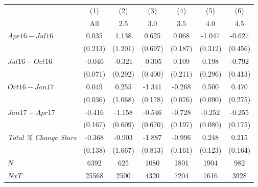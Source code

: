 \begin{center}
\begin{tabular}{lcccccc}
\hline  & (1) & (2) & (3) & (4) & (5) & (6)\\
 & All &  $ 2.5 $  &  $ 3.0 $  &  $ 3.5 $  &  $ 4.0 $  &  $ 4.5$ \\
\hline  $ Apr16-Jul16 $  & 0.035 & 1.138 & 0.625 & 0.068 & -1.047 & -0.627\\
 & (0.213) & (1.201) & (0.697) & (0.187) & (0.312) & (0.456)\\
 $ Jul16-Oct16 $  & -0.046 & -0.321 & -0.305 & 0.109 & 0.198 & -0.792\\
 & (0.071) & (0.292) & (0.400) & (0.211) & (0.296) & (0.413)\\
 $ Oct16-Jan17 $  & 0.049 & 0.255 & -1.341 & -0.268 & 0.500 & 0.470\\
 & (0.036) & (1.068) & (0.178) & (0.076) & (0.090) & (0.275)\\
 $ Jan17-Apr17 $  & -0.416 & -1.158 & -0.546 & -0.728 & -0.252 & -0.255\\
 & (0.167) & (0.609) & (0.670) & (0.197) & (0.080) & (0.175)\\
\hline \textit{Total \% Change Stars} & -0.368 & -0.903 & -1.887 & -0.996 & 0.248 & 0.215\\
  & (0.138) & (1.667) & (0.813) & (0.161) & (0.123) & (0.164)\\
\hline  $ N $  & 6392 & 625 & 1080 & 1801 & 1904 & 982\\
 $ NxT $  & 25568 & 2500 & 4320 & 7204 & 7616 & 3928\\
\hline\end{tabular}\\
\begin{tiny} \hfil\end{tiny}\\
\end{center}
